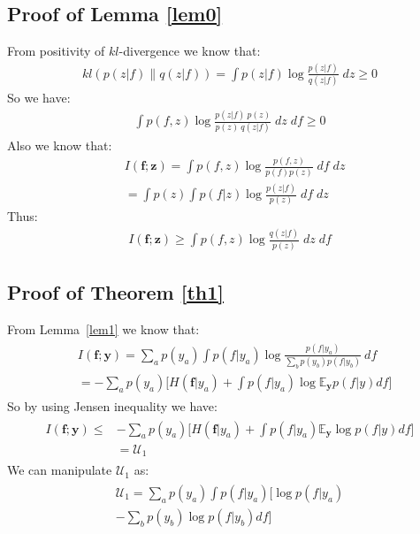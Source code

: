 \documentclass[10pt,journal,compsoc]{IEEEtran}
\begin{document}
\section{}\label{appendix:B}\subsection{Proof of Lemma \ref{lem0}}\label{appendix:B_1}
From positivity of $kl$-divergence we know that:
\begin{align*}
kl(p(z|f)\|q(z|f)) = \int p(z|f) \log \frac{p(z|f)}{q(z|f)} \; dz 	\geq 0
\end{align*}
So we have:
\begin{align*}
\int p(f,z) \log \frac{p(z|f)\:p(z)}{p(z)\: q(z|f)} \; dz \; df 	\geq 0
\end{align*}
Also we know that:
\begin{align*}
&I(\textbf{f};\textbf{z}) = \int p(f,z) \log \frac{p(f,z)}{p(f)p(z)} \; df \;dz \\
 						 &= \int p(z) \int p(f|z) \log \frac{p(z|f)}{p(z)}\; df \; dz					 
\end{align*}
Thus:
\begin{align*}
I(\textbf{f};\textbf{z}) \geq 
\int p(f,z) \log \frac{q(z|f)}{p(z)} \; dz \; df 	
\end{align*}\subsection{Proof of Theorem \ref{th1}}\label{appendix:B_2}
From Lemma~\ref{lem1} we know that:
\begin{align*}
\begin{split}
&I(\textbf{f};\textbf{y}) = \sum_a p(y_a) \int p(f|y_a) \log \frac{p(f|y_a)}{\sum_b p(y_b)p(f|y_b)}\ df \\
&= -\sum_a p(y_a) \bigg[ H(\textbf{f}|y_a) + \int p(f|y_a) \log\mathds{E}_{\textbf{y}} p(f|y)df  \bigg]
\end{split}
\end{align*} 
So by using Jensen inequality we have:
\begin{align*}
\begin{split}
I(\textbf{f};\textbf{y}) \leq & -\sum_a p(y_a) \bigg[ H(\textbf{f}|y_a) + \int p(f|y_a) \mathds{E}_{\textbf{y}}\log p(f|y)df  \bigg]\\
& = \mathcal{U}_1
\end{split}
\end{align*}
We can manipulate $\mathcal{U}_1$ as:
\begin{align*}
\begin{split}
\mathcal{U}_1 = \sum_a p(y_a) \int p(f|y_a) \Big[\log p(f|y_a)\\
 -   \sum_b p(y_b) \log p(f|y_b)df \Big]
\end{split}
\end{align*}
\end{document}
